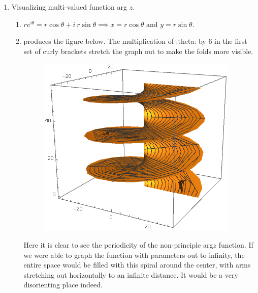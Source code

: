 \documentclass{article}
\begin{document}
\begin{enumerate}
	\item Visualizing multi-valued function arg $z$.
	\begin{enumerate}
		\item $re^{i\theta} = r\cos{\theta}+i \: r\sin{\theta} \implies x=r\cos{\theta} \text{ and } y=r\sin{\theta}$.
		\item {} produces the figure below. The multiplication of :theta: by 6 in the first set of curly brackets stretch the graph out to make the folds more visible. 
			\begin{figure}[H]
			\includegraphics[scale=0.8]{image6.png}
			\end{figure}
		Here it is clear to see the periodicity of the non-principle arg$z$ function. If we were able to graph the function with parameters out to infinity, the entire space would be filled with this spiral around the center, with arms stretching out horizontally to an infinite distance. It would be a very disorienting place indeed.
	\end{enumerate}
	
	
	
	
\end{enumerate}
\end{document}
